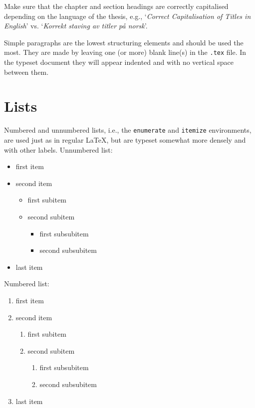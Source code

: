 Make sure that the chapter and section headings are correctly capitalised depending on the language of the thesis, e.g., `\emph{Correct Capitalisation of Titles in English}' vs. `\emph{Korrekt staving av titler på norsk}'. 

Simple paragraphs are the lowest structuring elements and should be used the most. They are made by leaving one (or more) blank line(s) in the \texttt{.tex} file. In the typeset document they will appear indented and with no vertical space between them.

\section{Lists}

Numbered and unnumbered lists, i.e., the \texttt{enumerate} and \texttt{itemize} environments, are used just as in regular \LaTeX{}, but are typeset somewhat more densely and with other labels. Unnumbered list:
\begin{itemize}
    \item first item
    \item second item
    \begin{itemize}
        \item first subitem
        \item second subitem
        \begin{itemize}
            \item first subsubitem
            \item second subsubitem
        \end{itemize}
    \end{itemize}
    \item last item
\end{itemize}
Numbered list:
\begin{enumerate}
    \item first item
    \item second item
    \begin{enumerate}
        \item first subitem
        \item second subitem
        \begin{enumerate}
            \item first subsubitem
            \item second subsubitem
        \end{enumerate}
    \end{enumerate}
    \item last item
\end{enumerate}

